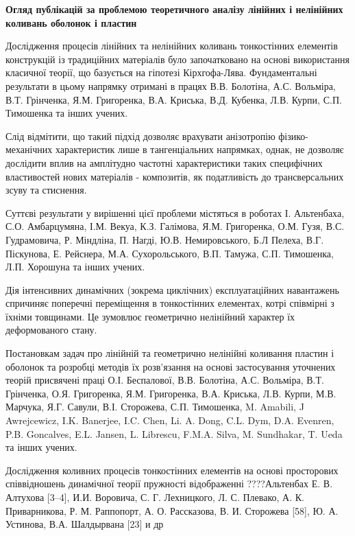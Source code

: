 \documentclass[10pt,a4paper]{article}
\numberwithin{figure}{section}
\numberwithin{equation}{section}
\begin{document}
\medskip 
\textbf{Огляд публікацій за проблемою теоретичного аналізу лінійних і нелінійних коливань оболонок і пластин}

\medskip 
Дослідження процесів лінійних та нелінійних коливань тонкостінних елементів конструкцій із традиційних матеріалів було започатковано на основі використання класичної теорії, що базується на гіпотезі Кірхгофа-Лява. Фундаментальні результати в цьому напрямку отримані в працях  В.В. Болотіна, А.С. Вольміра, В.Т. Грінченка, Я.М. Григоренка, В.А. Криська, В.Д. Кубенка, Л.В. Курпи, С.П. Тимошенка та інших учених. 

\medskip 
Слід відмітити, що такий підхід дозволяє врахувати анізотропію фізико-механічних характеристик лише в тангенціальних напрямках, однак, не дозволяє дослідити вплив на амплітудно частотні характеристики  таких специфічних властивостей нових матеріалів - композитів, як податливість до трансверсальних зсуву та стиснення.

\medskip Суттєві результати у вирішенні цієї проблеми містяться в роботах І. Альтенбаха, С.О. Амбарцумяна, І.М. Векуа, К.З. Галімова, Я.М. Григоренка, О.М. Гузя, В.С. Гудрамовича, Р. Міндліна, П. Нагді, Ю.В. Немировського, Б.Л Пелеха, В.Г. Піскунова, Е. Рейснера, М.А. Сухорольського, В.П. Тамужа, С.П. Тимошенка, Л.П. Хорошуна та інших учених.
\medskip 

Дія інтенсивних динамічних (зокрема циклічних) експлуатаційних навантажень спричиняє поперечні переміщення в тонкостінних елементах, котрі співмірні з їхніми товщинами. Це зумовлює геометрично нелінійний характер їх деформованого стану. 
\medskip 

Постановкам задач про лінійній та геометрично нелінійні коливання пластин і оболонок та розробці методів їх розв'язання на основі застосування уточнених теорій присвячені праці О.І. Беспалової, В.В. Болотіна, А.С. Вольміра, В.Т. Грінченка, О.Я. Григоренка, Я.М. Григоренка, В.А. Криська, Л.В. Курпи, М.В. Марчука, Я.Г. Савули, В.І. Сторожева, С.П. Тимошенка, M. Amabili, J Awrejcewicz, I.K. Banerjee, I.C. Chen, Li. A. Dong, C.L. Dym, D.A. Evenren, P.B. Goncalves, E.L. Jansen, L. Librescu, F.M.A. Silva, M. Sundhakar, T. Ueda та інших учених.
\medskip 

Дослідження коливних процесів тонкостінних елементів на основі просторових співвідношень динамічної теорії пружності відображенні ????Альтенбах Е. В. Алтухова [3–4], И.И. Воровича, С. Г. Лехницкого, Л. С. Плевако, А. К. Приварникова, Р. М. Раппопорт, А. О. Рассказова, В. И. Сторожева [58], Ю. А. Устинова, В.А. Шалдырвана [23] и др
\end{document}
